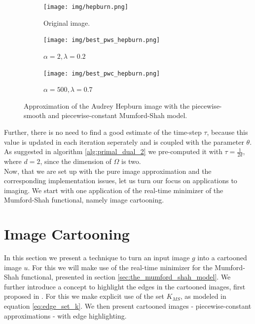 \documentclass{scrreprt}
\begin{document}
            \begin{figure}[!ht]
                \centering
                \begin{subfigure}[b]{0.32\textwidth}
                    \texttt{[image: img/hepburn.png]}
                    \caption{Original image.}
                \end{subfigure}
                \begin{subfigure}[b]{0.32\textwidth}
                    \texttt{[image: img/best\_pws\_hepburn.png]}
                    \caption{$\alpha = 2, \lambda = 0.2$}
                \end{subfigure}
                \begin{subfigure}[b]{0.32\textwidth}
                    \texttt{[image: img/best\_pwc\_hepburn.png]}
                    \caption{$\alpha = 500, \lambda = 0.7$}
                \end{subfigure}
                \caption[Comparing Audrey Hepburn pwc. and pws. using Mumford-Shah.]{Approximation of the Audrey Hepburn image with the piecewise-smooth and piecewise-constant Mumford-Shah model.}
            \label{fig:realtime_hepburn_compare}
            \end{figure}

            Further, there is no need to find a good estimate of the time-step $\tau$, because this value is updated in each iteration seperately and is coupled with the parameter $\theta$. As suggested in algorithm \ref{alg:primal_dual_2} we pre-computed it with $\tau = \frac{1}{2d}$, where $d = 2$, since the dimension of $\Omega$ is two.\\



    Now, that we are set up with the pure image approximation and the corresponding implementation issues, let us turn our focus on applications to imaging. We start with one application of the real-time minimizer of the Mumford-Shah functional, namely image cartooning.

    \section{Image Cartooning} %
    \label{sec:image_cartooning}
        
        In this section we present a technique to turn an input image $g$ into a cartooned image $u$. For this we will make use of the real-time minimizer for the Mumford-Shah functional, presented in section \ref{sec:the_mumford_shah_model}. We further introduce a concept to highlight the edges in the cartooned images, first proposed in \cite{Strekalovskiy-Cremers-eccv14}. For this we make explicit use of the set $K_{MS}$, as modeled in equation \ref{eq:edge_set_k}. We then present cartooned images - piecewise-constant approximations - with edge highlighting.
\end{document}
